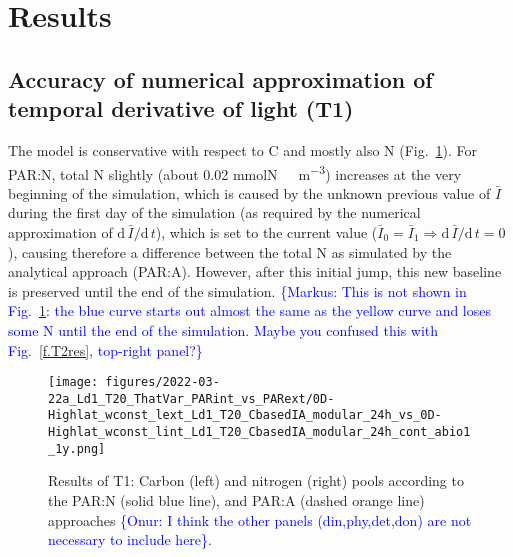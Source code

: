 \documentclass[gmd, manuscript]{copernicus}
\newcommand{\onur}[1]{\textcolor{blue}{\{Onur: #1\}}}
\newcommand{\markus}[1]{\textcolor{blue}{\{Markus: #1\}}}
\begin{document}




\section{Results}

\subsection{Accuracy of numerical approximation of temporal derivative of light (T1)}
The model is conservative with respect to C and mostly also N (Fig.~\ref{f.T1res}).  For PAR:N, total N slightly (about 0.02 \unit{mmolN\ m^{-3}}) increases at the very beginning of the simulation, which is caused by the unknown previous value of $\bar{I}$ during the first day of the simulation (as required by the numerical approximation of $\text{d}\,\bar{I}/\text{d}\,t$), which is set to the current value ($\bar{I}_{0} = \bar{I}_{1} \Rightarrow \text{d}\,\bar{I}/\text{d}\,t = 0$), causing therefore a difference between the total N as simulated by the analytical approach (PAR:A). However, after this initial jump, this new baseline is preserved until the end of the simulation. \markus{This is not shown in Fig.~\ref{f.T1res}: the blue curve starts out almost the same as the yellow curve and loses some N until the end of the simulation.  Maybe you confused this with Fig.~\ref{f.T2res}, top-right panel?}

\begin{figure}[ht!]
\texttt{[image: figures/2022-03-22a\_Ld1\_T20\_ThatVar\_PARint\_vs\_PARext/0D-Highlat\_wconst\_lext\_Ld1\_T20\_CbasedIA\_modular\_24h\_vs\_0D-Highlat\_wconst\_lint\_Ld1\_T20\_CbasedIA\_modular\_24h\_cont\_abio1\_1y.png]}
\caption{Results of T1: Carbon (left) and nitrogen (right) pools according to the PAR:N (solid blue line), and PAR:A (dashed orange line) approaches \onur{I think the other panels (din,phy,det,don) are not necessary to include here}.\label{f.T1res}}
\end{figure}
\end{document}
